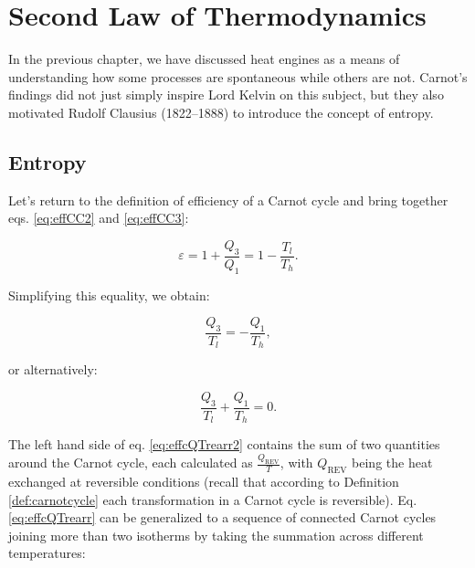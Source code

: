 \documentclass[
]{book}
\theoremstyle{definition}
\theoremstyle{definition}
\theoremstyle{definition}
\theoremstyle{remark}
\begin{document}
\hypertarget{SecondLaw}{%
\chapter{Second Law of Thermodynamics}\label{SecondLaw}}

In the previous chapter, we have discussed heat engines as a means of understanding how some processes are spontaneous while others are not. Carnot's findings did not just simply inspire Lord Kelvin on this subject, but they also motivated Rudolf Clausius (1822--1888) to introduce the concept of entropy.

\hypertarget{entropyint}{%
\section{Entropy}\label{entropyint}}

Let's return to the definition of efficiency of a Carnot cycle and bring together eqs. \eqref{eq:effCC2} and \eqref{eq:effCC3}:

\begin{equation}
\varepsilon = 1+\frac{Q_3}{Q_1} = 1-\frac{T_l}{T_h}.
\label{eq:effcQT}
\end{equation}

Simplifying this equality, we obtain:

\begin{equation}
\frac{Q_3}{T_l} = -\frac{Q_1}{T_h},
\label{eq:effcQTrearr}
\end{equation}

or alternatively:

\begin{equation}
\frac{Q_3}{T_l} + \frac{Q_1}{T_h} = 0.
\label{eq:effcQTrearr2}
\end{equation}

The left hand side of eq. \eqref{eq:effcQTrearr2} contains the sum of two quantities around the Carnot cycle, each calculated as \(\frac{Q_{\mathrm{REV}}}{T}\), with \(Q_{\mathrm{REV}}\) being the heat exchanged at reversible conditions (recall that according to Definition \ref{def:carnotcycle} each transformation in a Carnot cycle is reversible). Eq. \eqref{eq:effcQTrearr} can be generalized to a sequence of connected Carnot cycles joining more than two isotherms by taking the summation across different temperatures:
\end{document}
